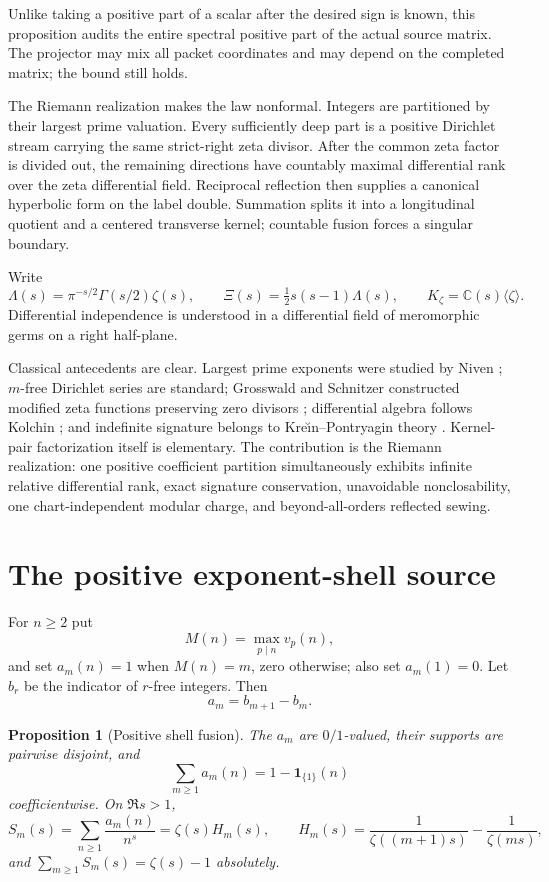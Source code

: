 \documentclass[11pt]{article}
\newtheorem{proposition}[theorem]{Proposition}
\theoremstyle{definition}
\theoremstyle{remark}
\newcommand{\C}{\mathbb C}
\begin{document}
Unlike taking a positive part of a scalar after the desired sign is known, this proposition
audits the entire spectral positive part of the actual source matrix.  The projector may mix all
packet coordinates and may depend on the completed matrix; the bound still holds.

The Riemann realization makes the law nonformal.  Integers are partitioned by their largest prime
valuation.  Every sufficiently deep part is a positive Dirichlet stream carrying the same
strict-right zeta divisor.  After the common zeta factor is divided out, the remaining directions
have countably maximal differential rank over the zeta differential field.  Reciprocal reflection
then supplies a canonical hyperbolic form on the label double.  Summation splits it into a
longitudinal quotient and a centered transverse kernel; countable fusion forces a singular
boundary.

Write
\[
 \Lambda(s)=\pi^{-s/2}\Gamma(s/2)\zeta(s),\qquad
 \Xi(s)=\tfrac12s(s-1)\Lambda(s),\qquad
 K_\zeta=\C(s)\langle\zeta\rangle.
\]
Differential independence is understood in a differential field of meromorphic germs on a right
half-plane.

Classical antecedents are clear.  Largest prime exponents were studied by Niven
\cite{Niven1969}; $m$-free Dirichlet series are standard; Grosswald and Schnitzer constructed
modified zeta functions preserving zero divisors \cite{GrosswaldSchnitzer1978}; differential
algebra follows Kolchin \cite{Kolchin1973}; and indefinite signature belongs to Kre\u\i n--Pontryagin
theory \cite{AzizovIokhvidov1989}.  Kernel-pair factorization itself is elementary.  The
contribution is the Riemann realization: one positive coefficient partition simultaneously
exhibits infinite relative differential rank, exact signature conservation, unavoidable
nonclosability, one chart-independent modular charge, and beyond-all-orders reflected sewing.

\section{The positive exponent-shell source}

For $n\geq2$ put
\[
 M(n)=\max_{p\mid n}v_p(n),
\]
and set $a_m(n)=1$ when $M(n)=m$, zero otherwise; also set $a_m(1)=0$.  Let $b_r$ be the
indicator of $r$-free integers.  Then
\[
 a_m=b_{m+1}-b_m.
 \tag{2.1}
\]

\begin{proposition}[Positive shell fusion]\label{prop:shells}
The $a_m$ are $0/1$-valued, their supports are pairwise disjoint, and
\[
 \sum_{m\geq1}a_m(n)=1-\mathbf1_{\{1\}}(n)
 \tag{2.2}
\]
coefficientwise.  On $\Re s>1$,
\[
 S_m(s)=\sum_{n\geq1}\frac{a_m(n)}{n^s}
 =\zeta(s)H_m(s),\qquad
 H_m(s)=\frac1{\zeta((m+1)s)}-\frac1{\zeta(ms)},
 \tag{2.3}
\]
and $\sum_{m\geq1}S_m(s)=\zeta(s)-1$ absolutely.
\end{proposition}
\end{document}
